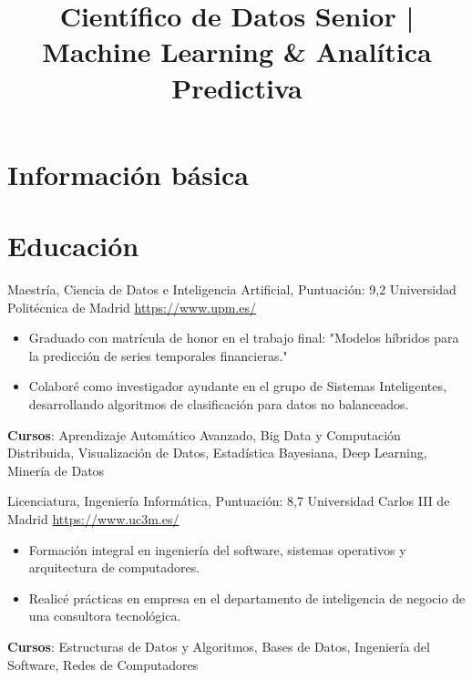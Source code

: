 \documentclass[a4paper, serif, 10pt]{moderncv}
\title{Científico de Datos Senior | Machine Learning \& Analítica Predictiva}
\begin{document}
\maketitle

\section{Información básica}

\section{Educación}

        {Maestría, Ciencia de Datos e Inteligencia Artificial, Puntuación: 9,2}
        {Universidad Politécnica de Madrid}
        {\url{https://www.upm.es/}}
        {}
        {\begin{itemize}
\item Graduado con matrícula de honor en el trabajo final: "Modelos híbridos para la predicción de series temporales financieras."
\item Colaboré como investigador ayudante en el grupo de Sistemas Inteligentes, desarrollando algoritmos de clasificación para datos no balanceados.
\end{itemize}
\textbf{Cursos}: Aprendizaje Automático Avanzado, Big Data y Computación Distribuida, Visualización de Datos, Estadística Bayesiana, Deep Learning, Minería de Datos}

        {Licenciatura, Ingeniería Informática, Puntuación: 8,7}
        {Universidad Carlos III de Madrid}
        {\url{https://www.uc3m.es/}}
        {}
        {\begin{itemize}
\item Formación integral en ingeniería del software, sistemas operativos y arquitectura de computadores.
\item Realicé prácticas en empresa en el departamento de inteligencia de negocio de una consultora tecnológica.
\end{itemize}
\textbf{Cursos}: Estructuras de Datos y Algoritmos, Bases de Datos, Ingeniería del Software, Redes de Computadores}
\end{document}
